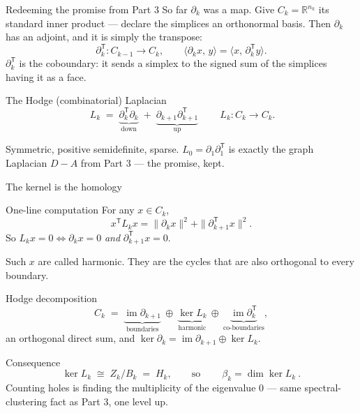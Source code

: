 \documentclass[10pt,aspectratio=169]{beamer}
\newcommand{\R}{\mathbb{R}}
\newcommand{\im}{\operatorname{im}}
\newcommand{\HL}[1]{\textcolor{blue!70!black}{#1}}
\begin{document}
    \begin{frame}{Redeeming the promise from Part 3}
        So far $\partial_k$ was a map. Give $C_k=\R^{n_k}$ its standard inner product ---
        declare the simplices an orthonormal basis. Then $\partial_k$ has an adjoint, and it
        is simply the transpose:
        \[
            \partial_k^{\mathsf T} : C_{k-1}\to C_k,
            \qquad \langle \partial_k x,\,y\rangle = \langle x,\,\partial_k^{\mathsf T} y\rangle .
        \]
        $\partial_k^{\mathsf T}$ is the \HL{coboundary}: it sends a simplex to the signed sum
        of the simplices having it as a face.

        \vspace{0.8em}

        \begin{block}{The Hodge (combinatorial) Laplacian}
            \[
                \boxed{\ L_k \;=\; \underbrace{\partial_k^{\mathsf T}\partial_k}_{\text{down}}
                    \;+\; \underbrace{\partial_{k+1}\partial_{k+1}^{\mathsf T}}_{\text{up}}\ }
                \qquad L_k : C_k\to C_k .
            \]
        \end{block}
        Symmetric, positive semidefinite, sparse. \HL{$L_0=\partial_1\partial_1^{\mathsf T}$
            is exactly the graph Laplacian $D-A$ from Part 3} --- the promise, kept.
    \end{frame}

    \begin{frame}[shrink=20]{The kernel is the homology}
        \begin{block}{One-line computation}
            For any $x\in C_k$,
            \[
                x^{\mathsf T}L_k x = \|\partial_k x\|^2 + \|\partial_{k+1}^{\mathsf T}x\|^2 .
            \]
            So $L_kx=0 \iff \partial_kx=0$ \emph{and} $\partial_{k+1}^{\mathsf T}x=0$.
        \end{block}
        Such $x$ are called \HL{harmonic}. They are the cycles that are also orthogonal to
        every boundary.

        \vspace{0.6em}

        \begin{block}{Hodge decomposition}
            \[
                C_k \;=\; \underbrace{\im\partial_{k+1}}_{\text{boundaries}}\ \oplus\
                \underbrace{\ker L_k}_{\text{harmonic}}\ \oplus\
                \underbrace{\im\partial_k^{\mathsf T}}_{\text{co-boundaries}} ,
            \]
            an orthogonal direct sum, and $\ker\partial_k=\im\partial_{k+1}\oplus\ker L_k$.
        \end{block}

        \vspace{0.3em}
        \begin{alertblock}{Consequence}
            \[
                \ker L_k \;\cong\; Z_k/B_k \;=\; H_k,
                \qquad\text{so}\qquad
                \boxed{\ \beta_k=\dim\ker L_k\ }.
            \]
            \centering \HL{Counting holes is finding the multiplicity of the eigenvalue $0$ ---
            same spectral-clustering fact as Part 3, one level up.}
        \end{alertblock}
    \end{frame}
\end{document}
